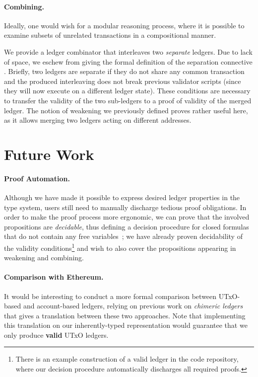 \documentclass[sigplan,review,screen]{acmart}\settopmatter{printfolios=true,printccs=false,printacmref=false}
\begin{document}
\paragraph{Combining.}
Ideally, one would wish for a modular reasoning process, where it is possible to examine subsets of 
unrelated transactions in a compositional manner.

We provide a ledger combinator that interleaves two \textit{separate} ledgers.
Due to lack of space, we eschew from giving the formal definition of the separation connective \inlineAst{}.
Briefly, two ledgers are separate if they do not share any common transaction and the produced interleaving 
does not break previous validator scripts (since they will now execute on a different ledger state).
These conditions are necessary to transfer the validity of the two sub-ledgers to a proof of validity of the merged ledger.
\combining{}
The notion of weakening we previously defined proves rather useful here,
as it allows merging two ledgers acting on different addresses.

\section{Future Work}
\label{sec:future}
\paragraph{Proof Automation.}
Although we have made it possible to express desired ledger properties in the type system,
users still need to manually discharge tedious proof obligations.
In order to make the proof process more ergonomic, we can prove that the involved propositions are \textit{decidable},
thus defining a decision procedure for closed formulas that do not contain any free variables~\cite{proofbyreflection};
we have already proven decidability of the validity conditions\footnote{
There is an example construction of a valid ledger in the code repository,
where our decision procedure automatically discharges all required proofs.
}
and wish to also cover the propositions appearing in weakening and combining.

\paragraph{Comparison with Ethereum.}
It would be interesting to conduct a more formal comparison between UTxO-based and account-based ledgers,
relying on previous work on \textit{chimeric ledgers}~\cite{chimeric} that gives a translation between these two approaches.
Note that implementing this translation on our inherently-typed representation would
guarantee that we only produce \textbf{valid} UTxO ledgers.
\end{document}
